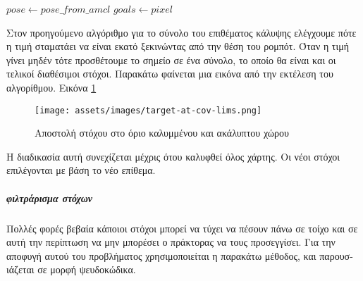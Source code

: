 
\begin{algorithmic}
	\State $pose \gets pose\_from\_amcl $
	\State	$goals \gets pixel$
	\EndIf
	\EndFor
\end{algorithmic}


Στον προηγούμενο αλγόριθμο για το σύνολο του επιθέματος κάλυψης ελέγχουμε πότε η τιμή σταματάει να είναι εκατό ξεκινώντας από την θέση του ρομπότ. Όταν η τιμή γίνει μηδέν τότε προσθέτουμε το σημείο σε ένα σύνολο, το οποίο θα είναι και οι τελικοί διαθέσιμοι στόχοι. Παρακάτω φαίνεται μια εικόνα από την εκτέλεση του αλγορίθμου. Εικόνα \ref{fig:target at cov limits}

\begin{figure}[!h]
	\centering
	\texttt{[image: assets/images/target-at-cov-lims.png]}
	\caption{Αποστολή στόχου στο όριο καλυμμένου και ακάλυπτου χώρου}
	\label{fig:target at cov limits}
\end{figure}

Η διαδικασία αυτή συνεχίζεται μέχρις ότου καλυφθεί όλος χάρτης. Οι νέοι στόχοι επιλέγονται με βάση το νέο επίθεμα. 

\subparagraph{φιλτράρισμα στόχων}

Πολλές φορές βεβαία κάποιοι στόχοι μπορεί να τύχει να πέσουν πάνω σε τοίχο και σε αυτή την περίπτωση να μην μπορέσει ο πράκτορας να τους προσεγγίσει. Για την αποφυγή αυτού του προβλήματος χρησιμοποιείται η παρακάτω μέθοδος,
και παρουσ-ιάζεται σε μορφή ψευδοκώδικα.  

